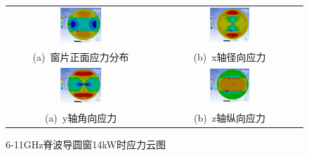 \documentclass[master]{thesis-uestc}
\begin{document}
\begin{figure}[!htb]
    \small
    \centering
    \begin{tabular}{@{\ }c@{\ }c}
        \includegraphics[width=0.29\textwidth]{pic/chapter3/14k窗片正面应力分布.png} & 
        \hspace{5pt}
        \includegraphics[width=0.29\textwidth]{pic/chapter3/14kXx轴径向应力.png}     \\
        \mbox{\small (a) 窗片正面应力分布}                                                                               & 
        \mbox{\small (b) x轴径向应力}                                                           \\[6bp]
        \includegraphics[width=0.29\textwidth]{pic/chapter3/14kXy角向应力.png} & 
        \hspace{5pt}
        \includegraphics[width=0.29\textwidth]{pic/chapter3/14kXz轴径向应力.png}     \\
        \mbox{\small (a) y轴角向应力}                                                                               & 
        \mbox{\small (b) z轴纵向应力}             
    \end{tabular}
    \caption{6-11GHz脊波导圆窗14kW时应力云图}
    \label{fig:X14kW时候的应力云图}
\end{figure}
\end{document}
